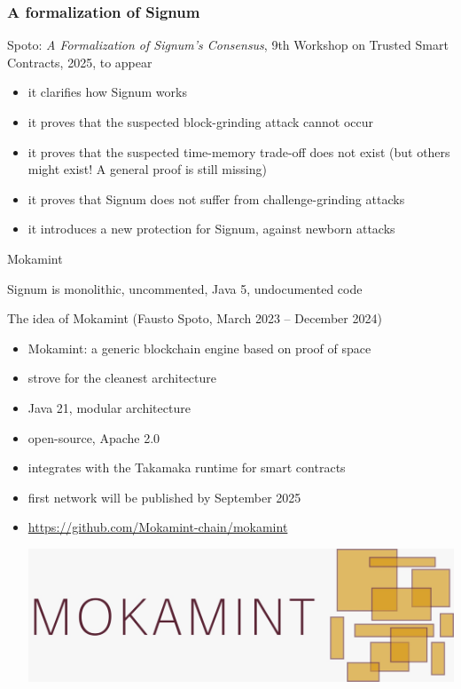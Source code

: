 \documentclass[11pt]{beamer}  %
\begin{document}
\begin{frame}\frametitle{A formalization of Signum}

  \begin{greenbox}{}
    Spoto: \emph{A Formalization of Signum's Consensus},
    9th Workshop on Trusted Smart Contracts, 2025, to appear
  \end{greenbox}

  \bigskip

  \begin{itemize}
  \item it clarifies how Signum works
  \item it proves that the suspected block-grinding attack cannot occur
  \item it proves that the suspected time-memory trade-off does not exist (but others might exist! A general proof is still missing)
  \item it proves that Signum does not suffer from challenge-grinding attacks
  \item it introduces a new protection for Signum, against newborn attacks
  \end{itemize}
  
\end{frame}

\begin{frame}{Mokamint}

  Signum is monolithic, uncommented, Java 5, undocumented code

  \bigskip
  \bigskip

  \begin{greenbox}{The idea of Mokamint (Fausto Spoto, March 2023 -- December 2024)}
    \begin{itemize}
    \item Mokamint: a generic blockchain engine based on proof of space
    \item strove for the cleanest architecture
    \item Java 21, modular architecture
    \item open-source, Apache 2.0
    \item integrates with the Takamaka runtime for smart contracts
    \item first network will be published by September 2025
    \item \url{https://github.com/Mokamint-chain/mokamint}
      \begin{center}
        \includegraphics[scale=0.08,clip=false]{pictures/mokamint_colors.jpg}
      \end{center}
    \end{itemize}
  \end{greenbox}

\end{frame}
\end{document}
